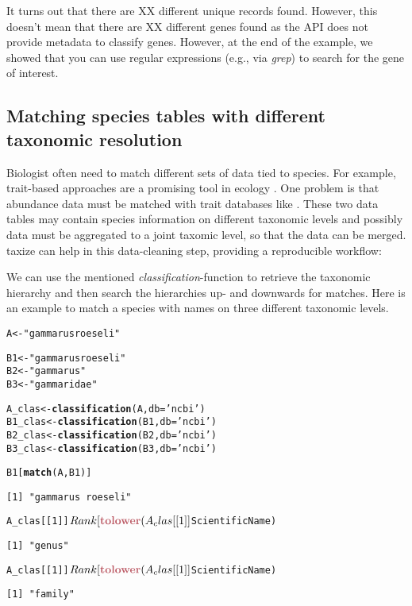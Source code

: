 \documentclass[10pt]{article}\usepackage[]{graphicx}\usepackage[]{color}
\makeatletter
\newcommand{\hlstr}[1]{\textcolor[rgb]{0.192,0.494,0.8}{#1}}%
\newcommand{\hlkwd}[1]{\textcolor[rgb]{0.737,0.353,0.396}{\textbf{#1}}}%
\newenvironment{kframe}{%
 \def\at@end@of@kframe{}%
 \ifinner\ifhmode%
  \def\at@end@of@kframe{\end{minipage}}%
  \begin{minipage}{\columnwidth}%
 \fi\fi%
 \def\FrameCommand##1{\hskip\@totalleftmargin \hskip-\fboxsep
 \colorbox{shadecolor}{##1}\hskip-\fboxsep
     \hskip-\linewidth \hskip-\@totalleftmargin \hskip\columnwidth}%
 \MakeFramed {\advance\hsize-\width
   \@totalleftmargin\z@ \linewidth\hsize
   \@setminipage}}%
 {\par\unskip\endMakeFramed%
 \at@end@of@kframe}
\newenvironment{knitrout}{}{} %
\makeatother
\begin{document}
It turns out that there are XX different unique records found. However, this doesn't mean that there are XX different genes found as the API does not provide metadata to classify genes. However, at the end of the example, we showed that you can use regular expressions (e.g., via \emph{grep}) to search for the gene of interest.


\subsection*{Matching species tables with different taxonomic resolution}
Biologist often need to match different sets of data tied to species. For example, trait-based approaches are a promising tool in ecology \cite{statzner_can_2010}. One problem is that abundance data must be matched with trait databases like \cite{usseglio-polatera_biological_2000}. These two data tables may contain species information on different taxonomic levels and possibly data must be aggregated to a joint taxomic level, so that the data can be merged. taxize can help in this data-cleaning step, providing a reproducible workflow: 

We can use the mentioned \emph{classification}-function to retrieve the taxonomic hierarchy and then search the hierarchies up- and downwards for matches. Here is an example to match a species with names on three different taxonomic levels.

\begin{knitrout}
\color{fgcolor}\begin{kframe}
\begin{alltt}
A <- \hlstr{"gammarus roeseli"} 

B1 <- \hlstr{"gammarus roeseli"}
B2 <- \hlstr{"gammarus"}
B3 <- \hlstr{"gammaridae"}

A_clas <- \hlkwd{classification}(A, db = \hlstr{'ncbi'})
B1_clas <- \hlkwd{classification}(B1, db = \hlstr{'ncbi'})
B2_clas <- \hlkwd{classification}(B2, db = \hlstr{'ncbi'})
B3_clas <- \hlkwd{classification}(B3, db = \hlstr{'ncbi'})


B1[\hlkwd{match}(A, B1)]
\end{alltt}
\begin{verbatim}
[1] "gammarus roeseli"
\end{verbatim}
\begin{alltt}
A_clas[[1]]$Rank[\hlkwd{tolower}(A_clas[[1]]$ScientificName) %in% B2]
\end{alltt}
\begin{verbatim}
[1] "genus"
\end{verbatim}
\begin{alltt}
A_clas[[1]]$Rank[\hlkwd{tolower}(A_clas[[1]]$ScientificName) %in% B3]
\end{alltt}
\begin{verbatim}
[1] "family"
\end{verbatim}
\end{kframe}
\end{knitrout}
\end{document}
